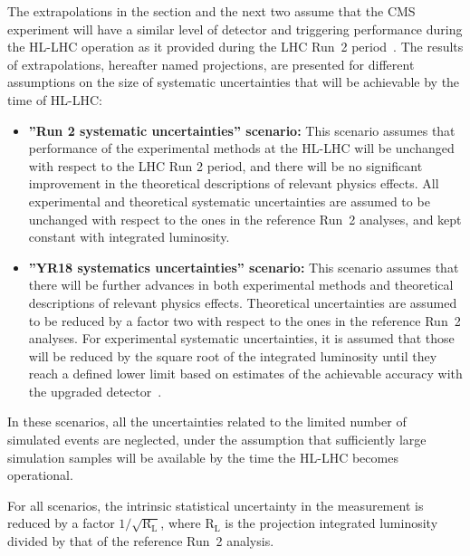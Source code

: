 The extrapolations in the section and the next two assume that the CMS experiment will have a similar level of detector and triggering performance during the HL-LHC operation as it provided during the LHC Run~2
period~\cite{CMSCollaboration:2015zni, Klein:2017nke, Collaboration:2283187, Collaboration:2293646, Collaboration:2283189}.
The results of extrapolations, hereafter named projections, are presented for different assumptions on the
size of systematic uncertainties that will be achievable by the time of HL-LHC:
\begin{itemize}
\item {\bf ''Run 2 systematic uncertainties'' scenario:} This scenario assumes that performance of the experimental methods at the HL-LHC will be unchanged with respect to the LHC Run 2 period, and there will be no significant improvement in the theoretical descriptions of relevant physics effects. All experimental and
theoretical systematic uncertainties are assumed to be unchanged with respect to the ones in
the reference Run~2 analyses, and kept constant with integrated luminosity.
\item {\bf ''YR18 systematics uncertainties'' scenario:} This scenario assumes that there will be further
advances in both experimental methods and theoretical descriptions of relevant physics effects.
Theoretical uncertainties are assumed to be reduced by a factor two with respect to the ones in the reference
Run~2 analyses. For experimental systematic uncertainties, it is assumed that those will be reduced by the square root
of the integrated luminosity until they reach a defined lower limit based on estimates of
the achievable accuracy with the upgraded detector~\cite{CMS:FTR-18-012}.
\end{itemize}

In these scenarios, all the uncertainties related to the limited number of simulated events are neglected,
 under the assumption that sufficiently large simulation samples will be available by the time the HL-LHC becomes operational.

For all scenarios, the intrinsic statistical uncertainty in the measurement is reduced by a
factor $1/\sqrt{\text{R}_\text{L}}$, where $\text{R}_\text{L}$ is the projection integrated luminosity divided by that of the
reference Run~2 analysis.

